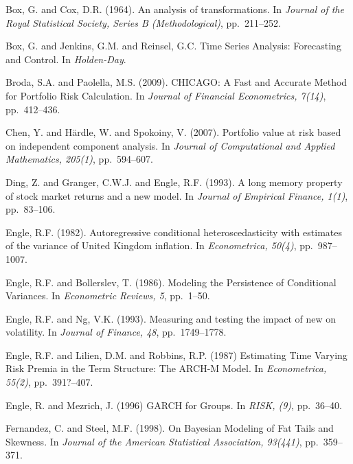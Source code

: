 \begin{thebibliography}{}
Box, G. and Cox, D.R. (1964).
\newblock An analysis of transformations.
\newblock In \emph{Journal of the Royal Statistical Society, Series B  (Methodological)}, pp.~211--252.

Box, G. and Jenkins, G.M. and Reinsel, G.C.
\newblock Time Series Analysis: Forecasting and Control.
\newblock In \emph{Holden-Day}.

Broda, S.A. and Paolella, M.S. (2009).
\newblock CHICAGO: A Fast and Accurate Method for Portfolio Risk Calculation.
\newblock In \emph{Journal of Financial Econometrics, 7(14)}, pp.~412--436.

Chen, Y. and H{\"{a}}rdle, W. and Spokoiny, V. (2007).
\newblock Portfolio value at risk based on independent component analysis.
\newblock In \emph{Journal of Computational and Applied Mathematics, 205(1)}, pp.~594--607.

Ding, Z. and Granger, C.W.J. and Engle, R.F. (1993).
\newblock A long memory property of stock market returns and a new model.
\newblock In \emph{Journal of Empirical Finance, 1(1)}, pp.~83--106.

Engle, R.F. (1982).
\newblock Autoregressive conditional heteroscedasticity with estimates of the variance of United Kingdom inflation.
\newblock In \emph{Econometrica, 50(4)}, pp.~987--1007.


Engle, R.F. and Bollerslev, T. (1986).
\newblock Modeling the Persistence of Conditional Variances.
\newblock In \emph{Econometric Reviews, 5}, pp.~1--50.

Engle, R.F. and Ng, V.K. (1993).
\newblock Measuring and testing the impact of new on volatility.
\newblock In \emph{Journal of Finance, 48}, pp.~1749--1778.


Engle, R.F. and Lilien, D.M. and Robbins, R.P. (1987)
\newblock Estimating Time Varying Risk Premia in the Term Structure: The ARCH-M Model.
\newblock In \emph{Econometrica, 55(2)}, pp.~391?--407.

Engle, R. and Mezrich, J. (1996)
\newblock GARCH for Groups.
\newblock In \emph{RISK, (9)}, pp.~36--40.

Fernandez, C. and Steel, M.F. (1998).
\newblock On Bayesian Modeling of Fat Tails and Skewness.
\newblock In \emph{Journal of the American Statistical Association, 93(441)}, pp.~359--371.


\end{thebibliography}
